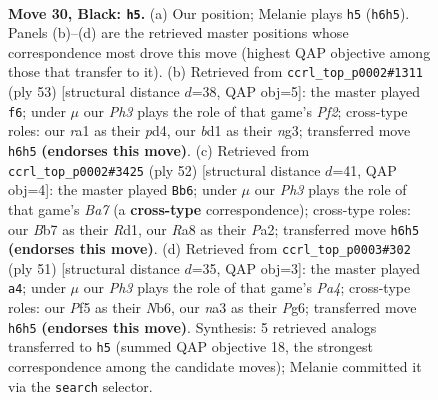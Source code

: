 \documentclass[11pt]{article}
\begin{document}
\clearpage

\begin{figure}[p]\centering
\begin{subfigure}{0.46\textwidth}\centering
\resizebox{\linewidth}{!}{%
\newchessgame
\chessboard[
  setfen={r7/pbpp2k1/1p3n1p/5p2/2P2P2/NP1K4/P2P3P/R2B4 b - - 6 30},
  showmover=false,
  pgfstyle=straightmove, color=movearrow, markmove={h6-h5}
]}
\caption{}
\end{subfigure}\hfill
\begin{subfigure}{0.46\textwidth}\centering
\resizebox{\linewidth}{!}{%
\newchessgame
\chessboard[
  setfen={2r3k1/p4pp1/1p5p/3n3P/3P4/P4PN1/1P1R1BP1/1b4K1 b - - 0 27},
  showmover=false,
  pgfstyle=straightmove, color=movearrow, markmove={f7-f6}
]}
\caption{}
\end{subfigure}
\\[4pt]
\begin{subfigure}{0.46\textwidth}\centering
\resizebox{\linewidth}{!}{%
\newchessgame
\chessboard[
  setfen={6k1/B1r3bp/p5p1/4pp2/2p5/2P4P/PP3PP1/3R2K1 w - - 2 27},
  showmover=false,
  pgfstyle=straightmove, color=movearrow, markmove={a7-b6}
]}
\caption{}
\end{subfigure}\hfill
\begin{subfigure}{0.46\textwidth}\centering
\resizebox{\linewidth}{!}{%
\newchessgame
\chessboard[
  setfen={1r6/4kp1p/1n3np1/pB2p3/3p4/P5P1/1PRNPP1P/6K1 b - - 6 26},
  showmover=false,
  pgfstyle=straightmove, color=movearrow, markmove={a5-a4}
]}
\caption{}
\end{subfigure}
\caption{\textbf{Move 30, Black: \texttt{h5}.} (a) Our position; Melanie plays \texttt{h5} (\texttt{h6h5}). Panels (b)--(d) are the retrieved master positions whose correspondence most drove this move (highest QAP objective among those that transfer to it). (b) Retrieved from \texttt{ccrl\_top\_p0002\#1311} (ply 53) [structural distance $d$=38, QAP obj=5]: the master played \texttt{f6}; under $\mu$ our \emph{Ph3} plays the role of that game's \emph{Pf2}; cross-type roles: our \emph{r}a1 as their \emph{p}d4, our \emph{b}d1 as their \emph{n}g3; transferred move \texttt{h6h5} \textbf{(endorses this move)}. (c) Retrieved from \texttt{ccrl\_top\_p0002\#3425} (ply 52) [structural distance $d$=41, QAP obj=4]: the master played \texttt{Bb6}; under $\mu$ our \emph{Ph3} plays the role of that game's \emph{Ba7} (a \textbf{cross-type} correspondence); cross-type roles: our \emph{B}b7 as their \emph{R}d1, our \emph{R}a8 as their \emph{P}a2; transferred move \texttt{h6h5} \textbf{(endorses this move)}. (d) Retrieved from \texttt{ccrl\_top\_p0003\#302} (ply 51) [structural distance $d$=35, QAP obj=3]: the master played \texttt{a4}; under $\mu$ our \emph{Ph3} plays the role of that game's \emph{Pa4}; cross-type roles: our \emph{P}f5 as their \emph{N}b6, our \emph{n}a3 as their \emph{P}g6; transferred move \texttt{h6h5} \textbf{(endorses this move)}. Synthesis: 5 retrieved analogs transferred to \texttt{h5} (summed QAP objective 18, the strongest correspondence among the candidate moves); Melanie committed it via the \texttt{search} selector.}
\label{fig:thought-m59}
\end{figure}
\end{document}
